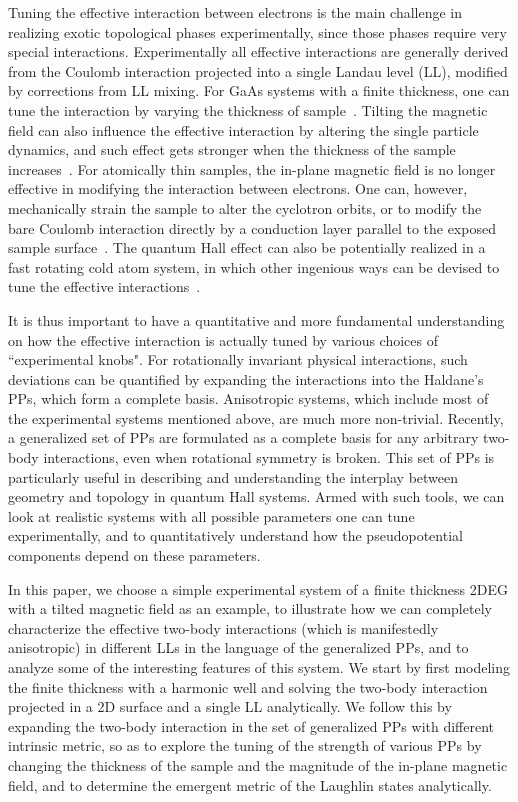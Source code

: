 \documentclass[twocolumn,showpacs,amsmath,amstex,amssymb,mathfonts,prb]{revtex4-1}
\begin{document}
Tuning the effective interaction between electrons is the main challenge in realizing exotic topological phases experimentally, since those phases require very special interactions. Experimentally all effective interactions are generally derived from the Coulomb interaction projected into a single Landau level (LL), modified by corrections from LL mixing\cite{DNSheng03,nayak, Ed13, MacDonald13}. For GaAs systems with a finite thickness, one can tune the interaction by varying the thickness of sample~\cite{dassarma08, sternrmp82}. Tilting the magnetic field can also influence the effective interaction by altering the single particle dynamics, and such effect gets stronger when the thickness of the sample increases~\cite{edtilt, xia11, Baldwin13}. For atomically thin samples, the in-plane magnetic field is no longer effective in modifying the interaction between electrons. One can, however, mechanically strain the sample to alter the cyclotron orbits, or to modify the bare Coulomb interaction directly by a conduction layer parallel to the exposed sample surface~\cite{straingraphene, kun13}. The quantum Hall effect can also be potentially realized in a fast rotating cold atom system, in which other ingenious ways can be devised to tune the effective interactions~\cite{Cooper08, qiu11}. 

It is thus important to have a quantitative and more fundamental understanding on how the effective interaction is actually tuned by various choices of ``experimental knobs".  For rotationally invariant physical interactions, such deviations can be quantified by expanding the interactions into the Haldane's PPs\cite{haldane1,haldane2}, which form a complete basis. Anisotropic systems, which include most of the experimental systems mentioned above, are much more non-trivial. Recently, a generalized set of PPs are formulated as a complete basis for any arbitrary two-body interactions, even when rotational symmetry is broken\cite{yang2}. This set of PPs is particularly useful in describing and understanding the interplay between geometry and topology in quantum Hall systems. Armed with such tools, we can look at realistic systems with all possible parameters one can tune experimentally, and to quantitatively understand how the pseudopotential components depend on these parameters.

In this paper, we choose a simple experimental system of a finite thickness 2DEG with a tilted magnetic field as an example, to illustrate how we can completely characterize the effective two-body interactions (which is manifestedly anisotropic) in different LLs in the language of the generalized PPs, and to analyze some of the interesting features of this system. We start by first modeling the finite thickness with a harmonic well and solving the two-body interaction projected in a 2D surface and a single LL analytically. We follow this by expanding the two-body interaction in the set of generalized PPs with different intrinsic metric, so as to explore the tuning of the strength of various PPs by changing the thickness of the sample and the magnitude of the in-plane magnetic field, and to determine the emergent metric of the Laughlin states analytically. 
\end{document}
